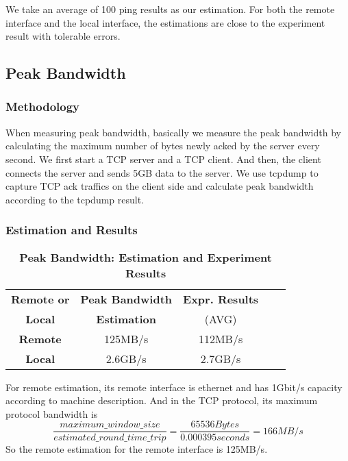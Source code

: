 We take an average of 100 ping results as our estimation. For both the remote interface and the local interface, the estimations are close to the experiment result with tolerable errors.

\subsection{Peak Bandwidth}

\subsubsection{Methodology}
When measuring peak bandwidth, basically we measure the peak bandwidth by calculating the maximum number of bytes newly acked by the server every second. We first start a TCP server and a TCP client. And then, the client connects the server and sends 5GB data to the server. We use tcpdump to capture TCP ack traffics on the client side and calculate peak bandwidth according to the tcpdump result.

\subsubsection{Estimation and Results}
\begin{table}[ht]
  \centering
  \caption{\textbf{Peak Bandwidth: Estimation and Experiment Results}}
  \begin{threeparttable}
  \begin{tabular}{ccccc}
  \hline
      \textbf{Remote or} & \textbf{Peak Bandwidth}   & \textbf{Expr. Results} \\
      \textbf{Local}   &  \textbf{Estimation}  & (AVG) \\
  \hline
      \textbf{Remote}  & 125MB/s & 112MB/s \\
      \textbf{Local} & 2.6GB/s & 2.7GB/s \\
  \hline
  \end{tabular}
  \end{threeparttable}
  \label{peak_bandwidth_table}
\end{table}

For remote estimation, its remote interface is ethernet and has 1Gbit/s capacity according to machine description. And in the TCP protocol, its maximum protocol bandwidth is $$\frac{maximum\_window\_size}{estimated\_round\_time\_trip} = \frac{65536 Bytes}{0.000395 seconds} = 166MB/s$$So the remote estimation for the remote interface is 125MB/s.

